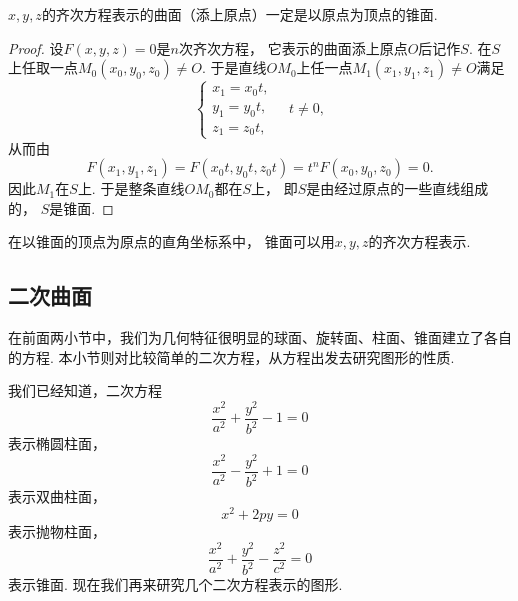 \begin{theorem}
\(x,y,z\)的齐次方程表示的曲面（添上原点）一定是以原点为顶点的锥面.
\begin{proof}
设\(F(x,y,z)=0\)是\(n\)次齐次方程，
它表示的曲面添上原点\(O\)后记作\(S\).
在\(S\)上任取一点\(M_0(x_0,y_0,z_0) \neq O\).
于是直线\(O M_0\)上任一点\(M_1(x_1,y_1,z_1) \neq O\)满足\[
	\left\{ \begin{array}{l}
		x_1 = x_0 t, \\
		y_1 = y_0 t, \\
		z_1 = z_0 t,
	\end{array} \right.
	\quad t \neq 0,
\]
从而由\[
	F(x_1,y_1,z_1) = F(x_0 t,y_0 t,z_0 t)
	= t^n F(x_0,y_0,z_0) = 0.
\]
因此\(M_1\)在\(S\)上.
于是整条直线\(O M_0\)都在\(S\)上，
即\(S\)是由经过原点的一些直线组成的，
\(S\)是锥面.
\end{proof}
\end{theorem}

\begin{theorem}
在以锥面的顶点为原点的直角坐标系中，
锥面可以用\(x,y,z\)的齐次方程表示.
\end{theorem}

\subsection{二次曲面}
在前面两小节中，我们为几何特征很明显的球面、旋转面、柱面、锥面建立了各自的方程.
本小节则对比较简单的二次方程，从方程出发去研究图形的性质.

我们已经知道，二次方程\[
	\frac{x^2}{a^2}+\frac{y^2}{b^2}-1=0
\]表示椭圆柱面，
\[
	\frac{x^2}{a^2}-\frac{y^2}{b^2}+1=0
\]表示双曲柱面，
\[
	x^2+2py=0
\]表示抛物柱面，
\[
	\frac{x^2}{a^2}+\frac{y^2}{b^2}-\frac{z^2}{c^2}=0
\]表示锥面.
现在我们再来研究几个二次方程表示的图形.


